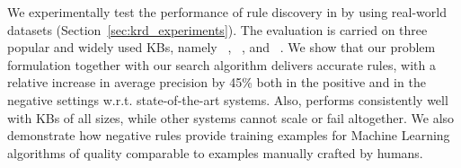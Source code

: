 \vspace{1ex}
We experimentally test the performance of rule discovery in \krd by using real-world datasets (Section~\ref{sec:krd_experiments}). The evaluation is carried on  three popular and widely used KBs, namely \dbpedia~\cite{bizer2009dbpedia}, \yago~\cite{suchanek2007yago}, and \wikidata~\cite{vrandevcic2014wikidata}. 
We show that our problem formulation together with our 
search algorithm delivers accurate rules, 
with a relative increase in average precision by 45\% both in the positive and in the negative settings w.r.t. state-of-the-art systems.
Also, \krd performs consistently well with KBs of all sizes, while other systems cannot scale or fail altogether. %
We also 
demonstrate how negative rules %
provide training examples for Machine Learning algorithms of quality comparable to examples manually crafted by humans.



